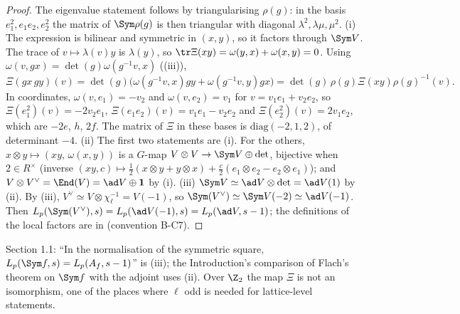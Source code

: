 \begin{proof}
The eigenvalue statement follows by triangularising $\rho(g)$: in the basis $e_1^2,e_1e_2,e_2^2$ the matrix of $\Sym\rho(g)$ is then triangular with
diagonal $\lambda^2,\lambda\mu,\mu^2$.
(i) The expression is bilinear and symmetric in $(x,y)$, so it factors through $\Sym V$. The trace of $v\mapsto\lambda(v)y$ is $\lambda(y)$, so
$\tr\Xi(xy)=\omega(y,x)+\omega(x,y)=0$. Using $\omega(v,gx)=\det(g)\omega(g^{-1}v,x)$ ((iii)),
\[
\Xi(gx\,gy)(v)=\det(g)\bigl(\omega(g^{-1}v,x)gy+\omega(g^{-1}v,y)gx\bigr)=\det(g)\,\rho(g)\Xi(xy)\rho(g)^{-1}(v).
\]
In coordinates, $\omega(v,e_1)=-v_2$ and $\omega(v,e_2)=v_1$ for $v=v_1e_1+v_2e_2$, so $\Xi(e_1^2)(v)=-2v_2e_1$, $\Xi(e_1e_2)(v)=v_1e_1-v_2e_2$ and
$\Xi(e_2^2)(v)=2v_1e_2$, which are $-2e$, $h$, $2f$. The matrix of $\Xi$ in these bases is $\mathrm{diag}(-2,1,2)$, of determinant $-4$.
(ii) The first two statements are (i). For the others, $x\otimes y\mapsto(xy,\,\omega(x,y))$ is a $G$-map $V\otimes V\to\Sym V\oplus\det$, bijective when
$2\in R^\times$ (inverse $(xy,c)\mapsto\frac12(x\otimes y+y\otimes x)+\frac c2(e_1\otimes e_2-e_2\otimes e_1)$); and $V\otimes V^\vee=\End(V)=\ad V\oplus\mathbf1$ by
(i).
(iii) $\Sym V\simeq\ad V\otimes\det=\ad V(1)$ by (ii). By (iii), $V^\vee\simeq V\otimes\chi_\ell^{-1}=V(-1)$, so
$\Sym(V^\vee)\simeq\Sym V(-2)\simeq\ad V(-1)$. Then $L_p(\Sym(V^\vee),s)=L_p(\ad V(-1),s)=L_p(\ad V,s-1)$; the definitions of the local factors are in
 (convention B-C7).
\end{proof}

\begin{paperlink}
Section 1.1: ``In the normalisation of the symmetric square, $L_p(\Sym f,s)=L_p(A_f,s-1)$'' is (iii); the Introduction's comparison of
Flach's theorem on $\Sym f$ with the adjoint uses (ii). Over $\Z_2$ the map $\Xi$ is not an isomorphism, one of the places where $\ell$
odd is needed for lattice-level statements.
\end{paperlink}

